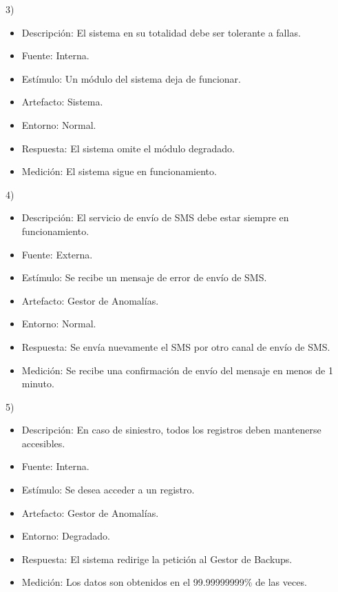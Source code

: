 \documentclass{article}
\theoremstyle{definition}
\theoremstyle{remark}
\begin{document}
3)
\begin{itemize}
  \item Descripción: El sistema en su totalidad debe ser tolerante a fallas.
  \item Fuente: Interna.
  \item Estímulo: Un módulo del sistema deja de funcionar.
  \item Artefacto: Sistema.
  \item Entorno: Normal.
  \item Respuesta: El sistema omite el módulo degradado.
  \item Medición: El sistema sigue en funcionamiento.
\end{itemize}

\pagebreak

4)
\begin{itemize}
  \item Descripción: El servicio de envío de SMS debe estar siempre en funcionamiento.
  \item Fuente: Externa.
  \item Estímulo: Se recibe un mensaje de error de envío de SMS.
  \item Artefacto: Gestor de Anomalías.
  \item Entorno: Normal.
  \item Respuesta: Se envía nuevamente el SMS por otro canal de envío de SMS.
  \item Medición: Se recibe una confirmación de envío del mensaje en menos de 1 minuto.
\end{itemize}

5)
\begin{itemize}
  \item Descripción: En caso de siniestro, todos los registros deben mantenerse accesibles.
  \item Fuente: Interna.
  \item Estímulo: Se desea acceder a un registro.
  \item Artefacto: Gestor de Anomalías.
  \item Entorno: Degradado.
  \item Respuesta: El sistema redirige la petición al Gestor de Backups.
  \item Medición: Los datos son obtenidos en el 99.99999999\% de las veces.
\end{itemize}
\end{document}
